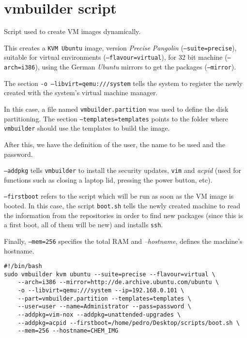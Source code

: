 \chapter{vmbuilder script} \label{chap:ap4}

Script used to create VM images dynamically.

This creates a \texttt{KVM Ubuntu} image, version \textit{Precise Pangolin} (\texttt{--suite=precise}), suitable for virtual environments (\texttt{--flavour=virtual}), for 32 bit machine (\texttt{--arch=i386}), using the German \textit{Ubuntu} mirrors to get the packages (\texttt{--mirror}).

The section \texttt{-o --libvirt=qemu:///system} tells the system to register the newly created with the system's virtual machine manager.

In this case, a file named \texttt{vmbuilder.partition} was used to define the disk partitioning. The section \texttt{--templates=templates} points to the folder where \texttt{vmbuilder} should use the templates to build the image. 

After this, we have the definition of the user, the name to be used and the password.

\texttt{--addpkg} tells \texttt{vmbuilder} to install the security updates, \texttt{vim} and \textit{acpid} (used for functions such as closing a laptop lid, pressing the power button, etc).

\texttt{--firstboot} refers to the script which will be run as soon as the VM image is booted. In this case, the script \texttt{boot.sh} tells the newly created machine to read the information from the repositories in order to find new packages (since this is a first boot, all of them will be new) and installs \texttt{ssh}.

Finally, \texttt{--mem=256} specifies the total RAM and \textit{--hostname}, defines the machine's hostname.
\begin{verbatim}
#!/bin/bash
sudo vmbuilder kvm ubuntu --suite=precise --flavour=virtual \
	--arch=i386 --mirror=http://de.archive.ubuntu.com/ubuntu \
	-o --libvirt=qemu:///system --ip=192.168.0.101 \
	--part=vmbuilder.partition --templates=templates \
	--user=user --name=Administrator --pass=password \
	--addpkg=vim-nox --addpkg=unattended-upgrades \
	--addpkg=acpid --firstboot=/home/pedro/Desktop/scripts/boot.sh \
	--mem=256 --hostname=CHEM_IMG
\end{verbatim}

